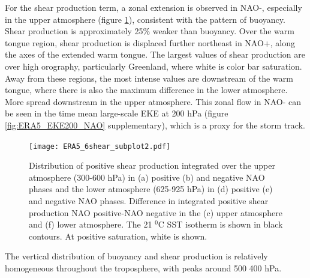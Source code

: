 For the shear production term, a zonal extension is observed in NAO-, especially in the upper atmosphere (figure \ref{fig:ERA5_shear}), consistent with the pattern of buoyancy. Shear production is approximately 25\% weaker than buoyancy. Over the warm tongue region, shear production is displaced further northeast in NAO+, along the axes of the extended warm tongue. The largest values of shear production are over high orography, particularly Greenland, where white is color bar saturation. Away from these regions, the most intense values are downstream of the warm tongue, where there is also the maximum difference in the lower atmosphere. More spread downstream in the upper atmosphere. This zonal flow in NAO- can be seen in the time mean large-scale EKE at 200 hPa (figure \ref{fig:ERA5_EKE200_NAO} supplementary), which is a proxy for the storm track.


\begin{figure}[h]
	\centering
	\texttt{[image: ERA5\_6shear\_subplot2.pdf]}
	\caption{Distribution of positive shear production integrated over the upper atmosphere (300-600 hPa) in (a) positive (b) and negative NAO phases and the lower atmosphere (625-925 hPa) in (d) positive (e) and negative NAO phases. Difference in integrated positive shear production NAO positive-NAO negative in the (c) upper atmosphere and (f) lower atmosphere. The 21 $^{0}$C SST isotherm is shown in black contours. At positive saturation, white is shown.}
	\label{fig:ERA5_shear}
\end{figure}


The vertical distribution of buoyancy and shear production is relatively homogeneous throughout the troposphere, with peaks around 500 400 hPa.




